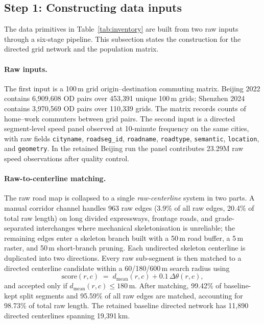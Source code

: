 \documentclass[12pt]{article}
\begin{document}
\subsection{Step 1: Constructing data inputs}\label{ssec:data_construction}

The data primitives in Table~\ref{tab:inventory} are built from two
raw inputs through a six-stage pipeline.  This subsection states the
construction for the directed grid network and the population
matrix.

\paragraph{Raw inputs.}
The first input is a 100\,m grid origin--destination commuting
matrix.  Beijing 2022 contains 6{,}909{,}608 OD pairs over
453{,}391 unique 100\,m grids; Shenzhen 2024 contains 3{,}970{,}569
OD pairs over 110{,}339 grids.  The matrix records counts of
home--work commuters between grid pairs.  The second input is a
directed segment-level speed panel observed at 10-minute frequency
on the same cities, with raw fields \texttt{cityname},
\texttt{roadseg\_id}, \texttt{roadname}, \texttt{roadtype},
\texttt{semantic}, \texttt{location}, and \texttt{geometry}.  In the
retained Beijing run the panel contributes 23.29M raw speed
observations after quality control.

\paragraph{Raw-to-centerline matching.}
The raw road map is collapsed to a single \emph{raw-centerline}
system in two parts.  A manual corridor channel handles 963 raw
edges (3.9\% of all raw edges, 20.4\% of total raw length) on long
divided expressways, frontage roads, and grade-separated
interchanges where mechanical skeletonisation is unreliable; the
remaining edges enter a skeleton branch built with a 50\,m road
buffer, a 5\,m raster, and 50\,m short-branch pruning.  Each
undirected skeleton centerline is duplicated into two directions.
Every raw sub-segment is then matched to a directed centerline
candidate within a 60/180/600\,m search radius using
\[
  \mathrm{score}(r,c)\;=\;d_{\mathrm{mean}}(r,c)+0.1\,\Delta\theta(r,c),
\]
and accepted only if $d_{\mathrm{mean}}(r,c)\le 180\,\text{m}$.
After matching, 99.42\% of baseline-kept split segments and 95.59\%
of all raw edges are matched, accounting for 98.73\% of total raw
length.  The retained baseline directed network has 11{,}890
directed centerlines spanning 19{,}391\,km.
\end{document}
